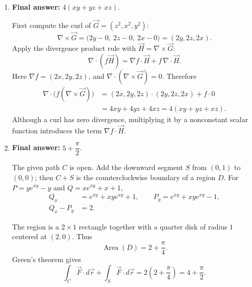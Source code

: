 \documentclass[12pt]{exam}
\begin{document}
\begin{enumerate}
\newpage

\item \textbf{Final answer:} $\boxed{4(xy+yz+xz)}$.

First compute the curl of $\vec G=(z^2,x^2,y^2)$:
\[
  \nabla\times\vec G
   =\bigl(2y-0,\ 2z-0,\ 2x-0\bigr)
   =(2y,2z,2x).
\]
Apply the divergence product rule with $\vec H=\nabla\times\vec G$:
\[
  \nabla\cdot(f\vec H)=\nabla f\cdot\vec H+f\,\nabla\cdot\vec H.
\]
Here $\nabla f=(2x,2y,2z)$, and
$\nabla\cdot(\nabla\times\vec G)=0$. Therefore
\[
\begin{aligned}
  \nabla\cdot\bigl(f(\nabla\times\vec G)\bigr)
    &=(2x,2y,2z)\cdot(2y,2z,2x)+f\cdot0\\
    &=4xy+4yz+4xz=4(xy+yz+xz).
\end{aligned}
\]
Although a curl has zero divergence, multiplying it by a nonconstant
scalar function introduces the term $\nabla f\cdot\vec H$.

\medskip
\item \textbf{Final answer:} $\boxed{5+\dfrac{\pi}{2}}$.

The given path $C$ is open. Add the downward segment $S$ from $(0,1)$
to $(0,0)$; then $C+S$ is the counterclockwise boundary of a region $D$.
For $P=ye^{xy}-y$ and $Q=xe^{xy}+x+1$,
\[
\begin{aligned}
  Q_x&=e^{xy}+xye^{xy}+1,\qquad
  P_y=e^{xy}+xye^{xy}-1,\\
  Q_x-P_y&=2.
\end{aligned}
\]

\noindent\begin{minipage}[c]{0.55\linewidth}
The region is a $2\times1$ rectangle together with a quarter disk of
radius $1$ centered at $(2,0)$. Thus
\[
  \operatorname{Area}(D)=2+\frac{\pi}{4}.
\]
Green's theorem gives
\[
  \int_C\vec F\cdot d\vec r+\int_S\vec F\cdot d\vec r
    =2\left(2+\frac{\pi}{4}\right)
    =4+\frac{\pi}{2}.
\]
\end{minipage}\hfill
\begin{minipage}[c]{0.41\linewidth}
\centering
{}
\end{minipage}


\end{enumerate}
\end{document}
